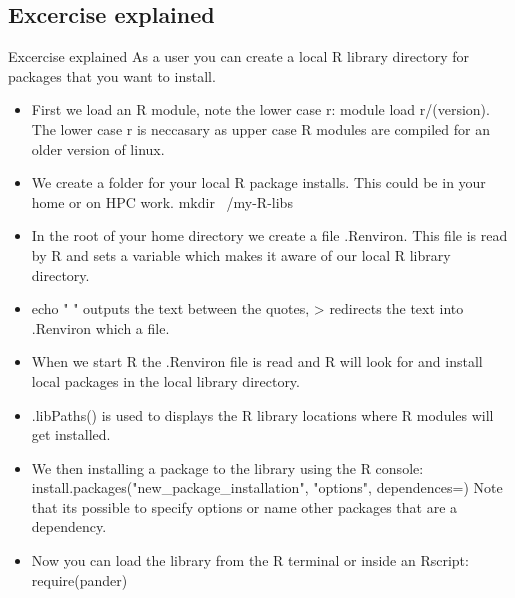 \subsection{Excercise explained}
\begin{frame}[fragile]{Excercise explained}
As a user you can create a local R library directory for packages that you want to install.
\begin{itemize}
\item First we load an R module, note the lower case r: module load r/(version). The lower case r is neccasary as upper case R modules are compiled for an older version of linux.
\item We create a folder for your local R package installs. This could be in your home or on HPC work.
mkdir ~/my-R-libs
\item In the root of your home directory we create a file .Renviron. This file is read by R and sets a variable which makes it aware of our local R library directory.
\item echo " " outputs the text between the quotes, > redirects the text into .Renviron which a file.
\item When we start R the .Renviron file is read and R will look for and install local packages in the local library directory.
\item .libPaths() is used to displays the R library locations where R modules will get installed. 
\item We then installing a package to the library using the R console:
install.packages("new_package_installation", "options", dependences=)
Note that its possible to specify options or name other packages that are a dependency. 
\item Now you can load the library from the R terminal or inside an Rscript:
require(pander)
\end{itemize}
\end{frame}
